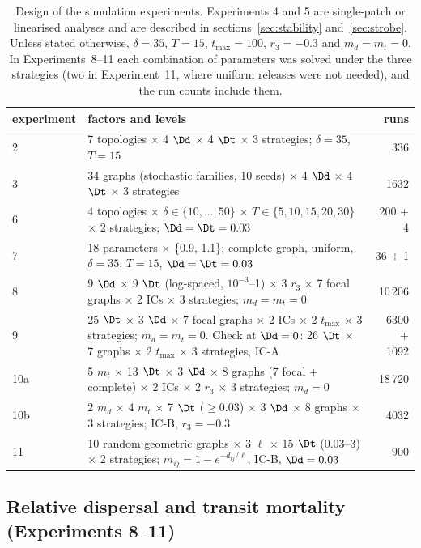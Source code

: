 \begin{table}[t]
\centering
\caption{Design of the simulation experiments. Experiments 4 and 5 are single-patch or linearised analyses and are described in sections~\ref{sec:stability} and~\ref{sec:strobe}. Unless stated otherwise, $\delta=35$, $T=15$, $t_{\max}=100$, $r_3=-0.3$ and $m_d=m_t=0$. In Experiments~8--11 each combination of parameters was solved under the three strategies (two in Experiment~11, where uniform releases were not needed), and the run counts include them.}
\label{tab:experiments}
\small
\begin{tabular}{p{1.9cm}p{10.2cm}r}
\toprule
experiment & factors and levels & runs\\
\midrule
2 & 7 topologies $\times$ 4 $\Dd$ $\times$ 4 $\Dt$ $\times$ 3 strategies; $\delta=35$, $T=15$ & 336\\
3 & 34 graphs (stochastic families, 10 seeds) $\times$ 4 $\Dd$ $\times$ 4 $\Dt$ $\times$ 3 strategies & 1632\\
6 & 4 topologies $\times$ $\delta\in\{10,\dots,50\}$ $\times$ $T\in\{5,10,15,20,30\}$ $\times$ 2 strategies; $\Dd=\Dt=0.03$ & 200 + 4\\
7 & 18 parameters $\times$ \{0.9, 1.1\}; complete graph, uniform, $\delta=35$, $T=15$, $\Dd=\Dt=0.03$ & 36 + 1\\
8 & 9 $\Dd$ $\times$ 9 $\Dt$ (log-spaced, $10^{-3}$--1) $\times$ 3 $r_3$ $\times$ 7 focal graphs $\times$ 2 ICs $\times$ 3 strategies; $m_d=m_t=0$ & 10\,206\\
9 & 25 $\Dt$ $\times$ 3 $\Dd$ $\times$ 7 focal graphs $\times$ 2 ICs $\times$ 2 $t_{\max}$ $\times$ 3 strategies; $m_d=m_t=0$. Check at $\Dd=0$: 26 $\Dt$ $\times$ 7 graphs $\times$ 2 $t_{\max}$ $\times$ 3 strategies, IC-A & 6300 + 1092\\
10a & 5 $m_t$ $\times$ 13 $\Dt$ $\times$ 3 $\Dd$ $\times$ 8 graphs (7 focal + complete) $\times$ 2 ICs $\times$ 2 $r_3$ $\times$ 3 strategies; $m_d=0$ & 18\,720\\
10b & 2 $m_d$ $\times$ 4 $m_t$ $\times$ 7 $\Dt$ ($\geq 0.03$) $\times$ 3 $\Dd$ $\times$ 8 graphs $\times$ 3 strategies; IC-B, $r_3=-0.3$ & 4032\\
11 & 10 random geometric graphs $\times$ 3 $\ell$ $\times$ 15 $\Dt$ (0.03--3) $\times$ 2 strategies; $m_{ij}=1-e^{-d_{ij}/\ell}$, IC-B, $\Dd=0.03$ & 900\\
\bottomrule
\end{tabular}
\end{table}

\subsection{Relative dispersal and transit mortality (Experiments 8--11)}
\label{sec:exp-transit}

